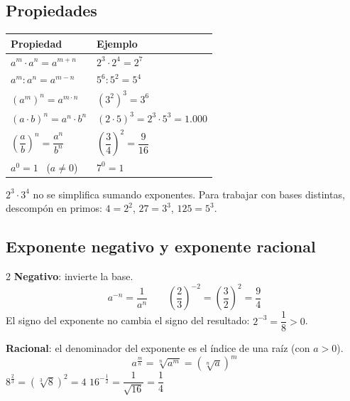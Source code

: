 \subsection{Propiedades}
\begin{center}
\renewcommand{\arraystretch}{1.4}
\begin{tabular}{ll}
\toprule Propiedad & Ejemplo\\ \midrule
$a^m\cdot a^n = a^{m+n}$ & $2^3\cdot 2^4 = 2^7$\\
$a^m : a^n = a^{m-n}$ & $5^6 : 5^2 = 5^4$\\
$(a^m)^n = a^{m\cdot n}$ & $(3^2)^3 = 3^6$\\
$(a\cdot b)^n = a^n\cdot b^n$ & $(2\cdot 5)^3 = 2^3\cdot 5^3 = 1.000$\\
$\left(\dfrac{a}{b}\right)^n = \dfrac{a^n}{b^n}$ & $\left(\dfrac{3}{4}\right)^2 = \dfrac{9}{16}$\\
$a^0 = 1$ \ ($a \neq 0$) & $7^0 = 1$\\ \bottomrule
\end{tabular}
\end{center}
\begin{ojo} $2^3\cdot 3^4$ no se simplifica sumando exponentes. Para trabajar con bases distintas, descompón en primos: $4 = 2^2$, $27 = 3^3$, $125 = 5^3$.\end{ojo}

\subsection{Exponente negativo y exponente racional}
\begin{multicols}{2}
\textbf{Negativo}: invierte la base.
\[ a^{-n} = \frac{1}{a^n} \qquad \left(\frac{2}{3}\right)^{-2} = \left(\frac{3}{2}\right)^2 = \frac{9}{4} \]
El signo del exponente no cambia el signo del resultado: $2^{-3} = \dfrac{1}{8} > 0$.

\columnbreak
\textbf{Racional}: el denominador del exponente es el índice de una raíz (con $a>0$).
\[ a^{\frac{m}{n}} = \sqrt[n]{a^m} = \left(\sqrt[n]{a}\right)^m \]
$8^{\frac{2}{3}} = \left(\sqrt[3]{8}\right)^2 = 4$ \quad $16^{-\frac{1}{2}} = \dfrac{1}{\sqrt{16}} = \dfrac{1}{4}$
\end{multicols}

